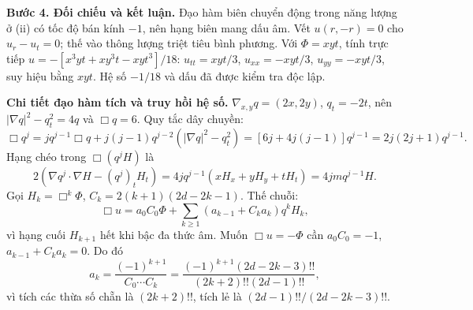 \textbf{Bước 4. Đối chiếu và kết luận.} Đạo hàm biên chuyển động trong năng lượng ở (ii) có tốc độ bán kính $-1$, nên hạng biên mang dấu âm. Vết $u(r,-r)=0$ cho $u_r-u_t=0$; thế vào thông lượng triệt tiêu bình phương. Với $\Phi=xyt$, tính trực tiếp $u=-[x^3yt+xy^3t-xyt^3]/18$: $u_{tt}=xyt/3$, $u_{xx}=-xyt/3$, $u_{yy}=-xyt/3$, suy hiệu bằng $xyt$. Hệ số $-1/18$ và dấu đã được kiểm tra độc lập.

\textbf{Chi tiết đạo hàm tích và truy hồi hệ số.} $\nabla_{x,y}q=(2x,2y)$, $q_t=-2t$, nên $|\nabla q|^2-q_t^2=4q$ và $\Box q=6$. Quy tắc dây chuyền:
\[\Box q^j=j q^{j-1}\Box q+j(j-1)q^{j-2}(|\nabla q|^2-q_t^2)
=[6j+4j(j-1)]q^{j-1}=2j(2j+1)q^{j-1}.\]
Hạng chéo trong $\Box(q^jH)$ là
\[2(\nabla q^j\cdot\nabla H-(q^j)_tH_t)
=4jq^{j-1}(xH_x+yH_y+tH_t)=4jmq^{j-1}H.\]
Gọi $H_k=\Box^k\Phi$, $C_k=2(k+1)(2d-2k-1)$. Thế chuỗi:
\[\Box u=a_0C_0\Phi+\sum_{k\ge1}(a_{k-1}+C_ka_k)q^kH_k,\]
vì hạng cuối $H_{k+1}$ hết khi bậc đa thức âm. Muốn $\Box u=-\Phi$ cần $a_0C_0=-1$, $a_{k-1}+C_ka_k=0$. Do đó
\[a_k=\frac{(-1)^{k+1}}{C_0\cdots C_k}
=\frac{(-1)^{k+1}(2d-2k-3)!!}{(2k+2)!!(2d-1)!!},\]
vì tích các thừa số chẵn là $(2k+2)!!$, tích lẻ là $(2d-1)!!/(2d-2k-3)!!$.
